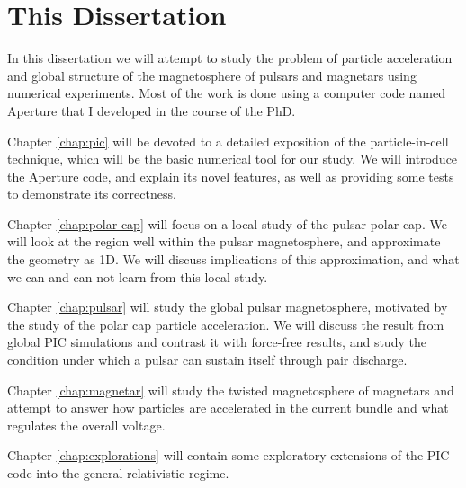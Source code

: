 \section{This Dissertation}
\label{sec:intro-outline}

In this dissertation we will attempt to study the problem of particle
acceleration and global structure of the magnetosphere of pulsars and
magnetars using numerical experiments. Most of the work is done using a computer
code named Aperture that I developed in the course of the PhD.

Chapter \ref{chap:pic} will be devoted to a detailed exposition of the
particle-in-cell technique, which will be the basic numerical tool for our
study. We will introduce the Aperture code, and explain its novel features, as
well as providing some tests to demonstrate its correctness.

Chapter \ref{chap:polar-cap} will focus on a local study of the pulsar
polar cap. We will look at the region well within the pulsar magnetosphere, and
approximate the geometry as 1D. We will discuss implications of this
approximation, and what we can and can not learn from this local study.

Chapter \ref{chap:pulsar} will study the global pulsar magnetosphere, motivated
by the study of the polar cap particle acceleration. We will discuss the
result from global PIC simulations and contrast it with force-free results, and
study the condition under which a pulsar can sustain itself through pair discharge.

Chapter \ref{chap:magnetar} will study the twisted magnetosphere of magnetars
and attempt to answer how particles are accelerated in the current bundle and
what regulates the overall voltage.

Chapter \ref{chap:explorations} will contain some exploratory extensions of the
PIC code into the general relativistic regime.

